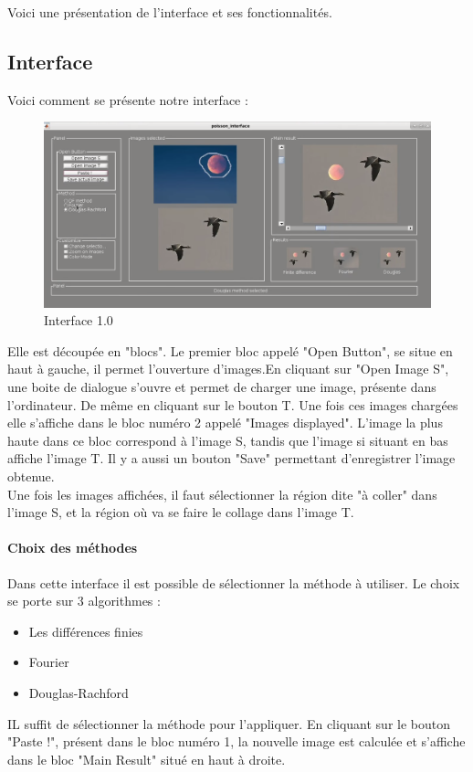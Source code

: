 Voici une présentation de l'interface et ses fonctionnalités.

\subsection{Interface}
Voici comment se présente notre interface : 
\begin{figure}[!h]
    \centering
    \includegraphics[scale = 0.3]{Images/interface.png}
    \caption{Interface 1.0}
\end{figure}{}
Elle est découpée en "blocs". Le premier bloc appelé "Open Button", se situe en haut à gauche, il permet l'ouverture d'images.En cliquant sur "Open Image S", une boite de dialogue s'ouvre et permet de charger une image, présente dans l'ordinateur. De même en cliquant sur le bouton T. Une fois ces images chargées elle s'affiche dans le bloc numéro 2 appelé "Images displayed". L'image la plus haute dans ce bloc correspond à l'image S, tandis que l'image si situant en bas affiche l'image T.
Il y a aussi un bouton "Save" permettant d'enregistrer l'image obtenue.\\ Une fois les images affichées, il faut sélectionner la région dite "à coller" dans l'image S,  et la région où va se faire le collage dans l'image T.\\

\paragraph{Choix des méthodes}
Dans cette interface il est possible de sélectionner la méthode à utiliser. Le choix se porte sur 3 algorithmes : 
\begin{itemize}
    \item Les différences finies
    \item Fourier 
    \item Douglas-Rachford
\end{itemize}{}
IL suffit de sélectionner la méthode pour l'appliquer.
En cliquant sur le bouton "Paste !", présent dans le bloc numéro 1, la nouvelle image est calculée et s'affiche dans le bloc "Main Result" situé en haut à droite. 
